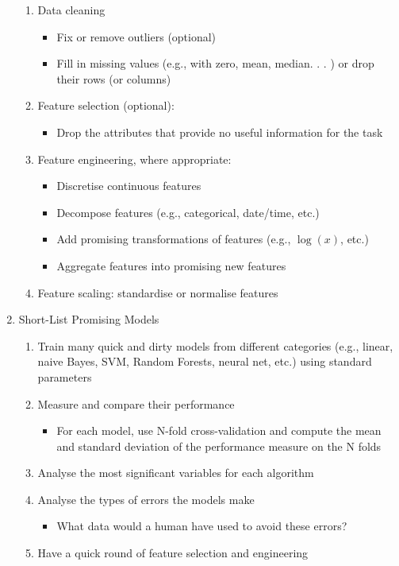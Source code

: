 \documentclass[11pt]{article}
\begin{document}
\begin{enumerate}
\begin{enumerate}
\item Data cleaning
\begin{itemize}
\item Fix or remove outliers (optional)
\item Fill in missing values (e.g., with zero, mean, median. . . ) or drop their rows (or columns)
\end{itemize}
\item Feature selection (optional):
\begin{itemize}
\item Drop the attributes that provide no useful information for the task
\end{itemize}
\item Feature engineering, where appropriate:
\begin{itemize}
\item Discretise continuous features
\item Decompose features (e.g., categorical, date/time, etc.)
\item Add promising transformations of features (e.g., \(\log(x)\), etc.)
\item Aggregate features into promising new features
\end{itemize}
\item Feature scaling: standardise or normalise features
\end{enumerate}
\item Short-List Promising Models
\begin{enumerate}
\item Train many quick and dirty models from different categories (e.g., linear, naive Bayes, SVM, Random Forests, neural net, etc.) using standard parameters
\item Measure and compare their performance
\begin{itemize}
\item For each model, use N-fold cross-validation and compute the mean and standard deviation of the performance measure on the N folds
\end{itemize}
\item Analyse the most significant variables for each algorithm
\item Analyse the types of errors the models make
\begin{itemize}
\item What data would a human have used to avoid these errors?
\end{itemize}
\item Have a quick round of feature selection and engineering

\end{enumerate}
\end{enumerate}
\end{document}

